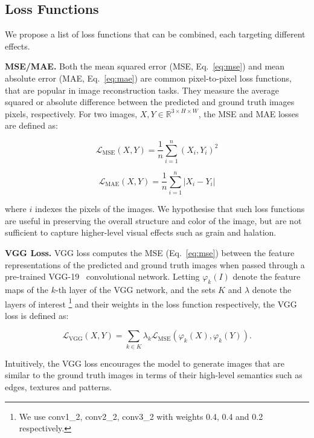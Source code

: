 \subsection{Loss Functions}
\label{subsec:loss-functions}

We propose a list of loss functions that can be combined, each targeting different effects.

\textbf{MSE/MAE.} Both the mean squared error (MSE, Eq.~\ref{eq:mse}) and mean absolute error (MAE, Eq.~\ref{eq:mae}) are common pixel-to-pixel loss functions, that are popular in image reconstruction tasks. They measure the average squared or absolute difference between the predicted and ground truth images pixels, respectively. For two images, $X, Y \in \mathbb{R}^{3 \times H \times W}$, the MSE and MAE losses are defined as:
\begin{multicols}{2}
\begin{equation}
    \mathcal{L}_\text{MSE}(X, Y) = \frac{1}{n} \sum_{i=1}^{n} (X_i, Y_i)^2
    \label{eq:mse}
\end{equation}

\begin{equation}
    \mathcal{L}_\text{MAE}(X, Y) = \frac{1}{n} \sum_{i=1}^{n} |X_i - Y_i|
    \label{eq:mae}
\end{equation}
\end{multicols}

where $i$ indexes the pixels of the images. We hypothesise that
such loss functions are useful in preserving the overall structure and color of the image,
but are not sufficient to capture higher-level visual effects such as grain and
halation.

\textbf{VGG Loss.} VGG loss computes the MSE (Eq.~\ref{eq:mse}) between the feature representations of the predicted and ground truth images when passed through a pre-trained VGG-19~\cite{vgg} convolutional network. Letting $\varphi_k(I)$ denote the feature maps of the $k$-th layer of the VGG network, and the sets $K$ and $\lambda$ denote the layers of interest \footnote{We use conv1\_2, conv2\_2, conv3\_2 with weights 0.4, 0.4 and 0.2 respectively.} and their weights in the loss function respectively, the VGG loss is defined as:

\begin{equation}
   \mathcal{L}_\text{VGG}(X, Y) = \sum_{k \in K} \lambda_k \mathcal{L}_\text{MSE}(\varphi_k(X), \varphi_k(Y)).
    \label{eq:vgg}
\end{equation}

Intuitively, the VGG loss encourages the model to generate images that are similar to the ground truth images in terms of their high-level semantics such 
as edges, textures and patterns.

